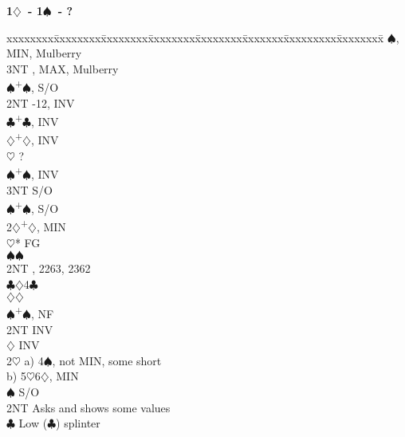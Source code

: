\documentclass[10pt]{article}
\renewcommand{\c}{$\clubsuit$}
\renewcommand{\d}{$\diamondsuit$}
\newcommand{\h}{$\heartsuit$}
\newcommand{\s}{$\spadesuit$}
\newcommand{\p}{\textsuperscript{+}}
\newenvironment{bidtable}[1][]
{\textbf{#1}
  \begin{adjustwidth}{1em}{}
    \addvspace{2pt}
    \begin{tabbing}
      xxxxxxxx\=xxxxxxxx\=xxxxxxxx\=xxxxxxxx\=xxxxxxxx\=xxxxxxx\=xxxxxxxxx\=xxxxxxxx\=\kill}
{\end{tabbing}\end{adjustwidth}\bigskip}%
\begin{document}
\begin{bidtable}[1\d\ - 1\s\ - ?]
     \>      \s {}, MIN, Mulberry                         \\
     \>      \> 3NT , MAX, Mulberry                         \\
     \s  {}\p\s, S/O                                         \\
     \> 2NT  -12, INV                                          \\
     \c  {}\p\c, INV                                         \\
     \d  {}\p\d, INV                                         \\
     \h  \> ?                                                  \\
     \s  {}\p\s, INV                                         \\
     \> 3NT  \> S/O                                                \\
     \s  {}\p\s, S/O                                         \\
2\d  {}\p\d, MIN                                                 \\
     \h* \> FG                                                 \\
     \>      \s {}\s                                         \\
     \>      \> 2NT , 2263, 2362                            \\
     \>      \c {}\d 4\c                                     \\
     \>      \d {}\d                                         \\
     \s  {}\p\s, NF                                          \\
     \> 2NT  \> INV                                                \\
     \d  \> INV                                                \\
2\h  \> a) 4\s, not MIN, some short                                \\
     \> b) 5\h 6\d, MIN                                            \\
     \s  \> S/O                                                \\
     \> 2NT  \> Asks and shows some values                         \\
     \>      \c \> Low (\c) splinter                           \\

\end{bidtable}
\end{document}
